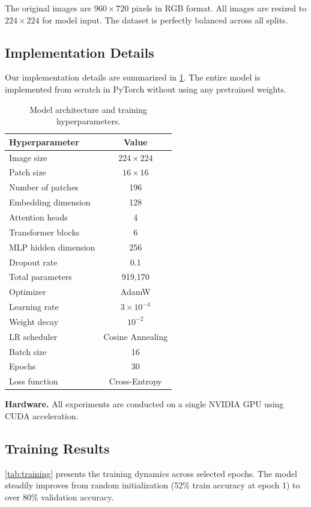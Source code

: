 \documentclass[10pt,twocolumn,letterpaper]{article}
\begin{document}
The original images are $960 \times 720$ pixels in RGB format. All images are resized to $224 \times 224$ for model input. The dataset is perfectly balanced across all splits.

\subsection{Implementation Details}

Our implementation details are summarized in \cref{tab:hyperparams}. The entire model is implemented from scratch in PyTorch without using any pretrained weights.

\begin{table}[h]
\centering
\caption{Model architecture and training hyperparameters.}
\label{tab:hyperparams}
\begin{tabular}{lc}
\toprule
\textbf{Hyperparameter} & \textbf{Value} \\
\midrule
Image size & $224 \times 224$ \\
Patch size & $16 \times 16$ \\
Number of patches & 196 \\
Embedding dimension & 128 \\
Attention heads & 4 \\
Transformer blocks & 6 \\
MLP hidden dimension & 256 \\
Dropout rate & 0.1 \\
\midrule
Total parameters & 919,170 \\
\midrule
Optimizer & AdamW \\
Learning rate & $3 \times 10^{-4}$ \\
Weight decay & $10^{-2}$ \\
LR scheduler & Cosine Annealing \\
Batch size & 16 \\
Epochs & 30 \\
Loss function & Cross-Entropy \\
\bottomrule
\end{tabular}
\end{table}

\textbf{Hardware.} All experiments are conducted on a single NVIDIA GPU using CUDA acceleration.

\subsection{Training Results}

\cref{tab:training} presents the training dynamics across selected epochs. The model steadily improves from random initialization (52\% train accuracy at epoch 1) to over 80\% validation accuracy.
\end{document}
